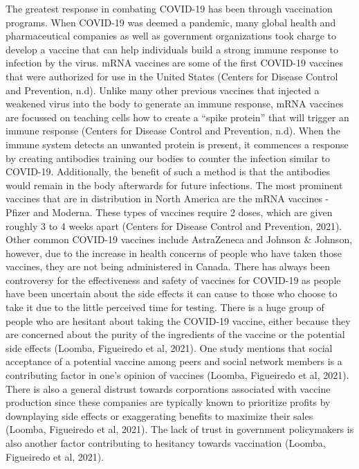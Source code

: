 \documentclass[10pt,twocolumn,letterpaper]{article}
\begin{document}
The greatest response in combating COVID-19 has been through vaccination programs. When COVID-19 was deemed a pandemic, many global health and pharmaceutical companies as well as government organizations took charge to develop a vaccine that can help individuals build a strong immune response to infection by the virus. mRNA vaccines are some of the first COVID-19 vaccines that were authorized for use in the United States (Centers for Disease Control and Prevention, n.d).  Unlike many other previous vaccines that injected a weakened virus into the body to generate an immune response, mRNA vaccines are focussed on teaching cells how to create a “spike protein” that will trigger an immune response (Centers for Disease Control and Prevention, n.d). When the immune system detects an unwanted protein is present, it commences a response by creating antibodies training our bodies to counter the infection similar to COVID-19. Additionally, the benefit of such a method is that the antibodies would remain in the body afterwards for future infections. The most prominent vaccines that are in distribution in North America are the mRNA vaccines - Pfizer and Moderna. These types of vaccines require 2 doses,  which are given roughly 3 to 4 weeks apart (Centers for Disease Control and Prevention, 2021). Other common COVID-19 vaccines include AstraZeneca and Johnson & Johnson, however, due to the increase in health concerns of people who have taken those vaccines, they are not being administered in Canada. There has always been controversy for the effectiveness and safety of vaccines for COVID-19 as people have been uncertain about the side effects it can cause to those who choose to take it due to the little perceived time for testing. There is a huge group of people who are hesitant about taking the COVID-19 vaccine, either because they are concerned about the purity of the ingredients of the vaccine or the potential side effects (Loomba, Figueiredo et al, 2021). One study mentions that social acceptance of a potential vaccine among peers and social network members is a contributing factor in one’s opinion of vaccines (Loomba, Figueiredo et al, 2021). There is also a general distrust towards corporations associated with vaccine production since these companies are typically known to prioritize profits by downplaying side effects or exaggerating benefits to maximize their sales (Loomba, Figueiredo et al, 2021). The lack of trust in government policymakers is also another factor contributing to hesitancy towards vaccination (Loomba, Figueiredo et al, 2021). 
\end{document}
